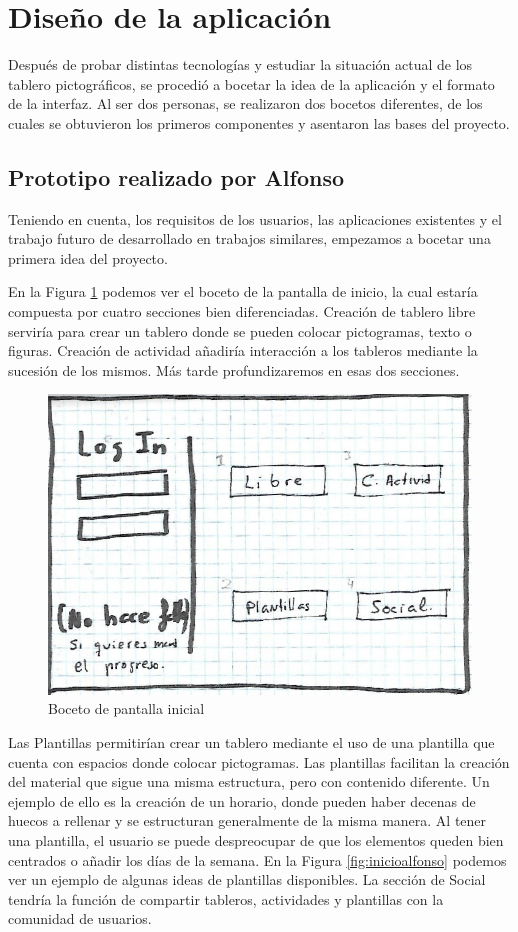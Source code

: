 \section{Diseño de la aplicación}

Después de probar distintas tecnologías y estudiar la situación actual de los tablero pictográficos, se procedió a bocetar la idea de la aplicación y el formato de la interfaz. Al ser dos personas, se realizaron dos bocetos diferentes, de los cuales se obtuvieron los primeros componentes y asentaron las bases del proyecto.


\subsection{Prototipo realizado por Alfonso}

Teniendo en cuenta, los requisitos de los usuarios, las aplicaciones existentes y el trabajo futuro de desarrollado en trabajos similares, empezamos a bocetar una primera idea del proyecto.


En la Figura \ref{fig:loginalfonso} podemos ver el boceto de la pantalla de  inicio, la cual estaría compuesta por cuatro secciones bien diferenciadas. Creación de tablero libre serviría para crear un tablero donde se pueden colocar pictogramas, texto o figuras. Creación de actividad añadiría interacción a los tableros mediante la sucesión de los mismos. Más tarde profundizaremos en esas dos secciones.

\begin{figure}[h!]
	\centering
	\includegraphics[width=0.7\linewidth]{Imagenes/Bitmap/logInAlfonso}
	\caption{Boceto de pantalla inicial}
	\label{fig:loginalfonso}
\end{figure}

Las Plantillas permitirían crear un tablero mediante el uso de una plantilla que cuenta con espacios donde colocar pictogramas. Las plantillas facilitan la creación del material que sigue una misma estructura, pero con contenido diferente. Un ejemplo de ello es la creación de un horario, donde pueden haber decenas de huecos a rellenar y se estructuran generalmente de la misma manera. Al tener una plantilla, el usuario se puede despreocupar de que los elementos queden bien centrados o añadir los días de la semana. En la Figura \ref{fig:inicioalfonso} podemos ver un ejemplo de algunas ideas de plantillas disponibles. 
La sección de Social tendría la función de compartir tableros, actividades y plantillas con la comunidad de usuarios.

